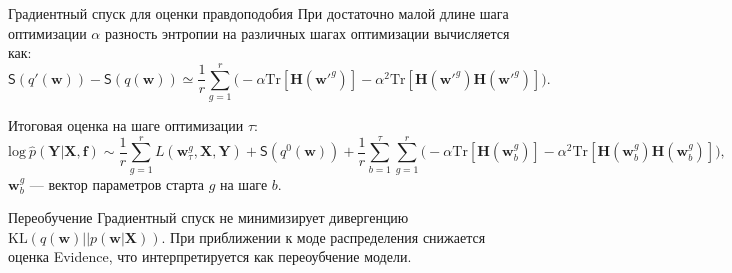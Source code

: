 \documentclass[10pt,pdf,utf8,russian,aspectratio=169]{beamer}
\begin{document}
\begin{frame}{Градиентный спуск для оценки правдоподобия}
При достаточно малой длине шага оптимизации $\alpha$ разность энтропии на различных шагах оптимизации вычисляется как:
\[
\mathsf{S}(q'(\mathbf{w})) -  \mathsf{S}(q(\mathbf{w}))  \simeq  \frac{1}{r}\sum_{g=1}^r \bigl(-\alpha \text{Tr}[\mathbf{H}(\mathbf{w}'^g)] - \alpha^2 \text{Tr}[\mathbf{H}(\mathbf{w}'^g)\mathbf{H}(\mathbf{w}'^g)]  \bigr).
\]

Итоговая оценка на шаге оптимизации $\tau$:
$$
\text{log}~\hat{p}(\mathbf{Y}|\mathbf{X}, \mathbf{f}) \sim \frac{1}{r} \sum_{g = 1}^r L(\mathbf{w}^g_\tau, \mathbf{X}, \mathbf{Y})  + \mathsf{S}(q^0(\mathbf{w})) + \frac{1}{r}\sum_{b=1}^\tau\sum_{g=1}^r \bigl(-\alpha \text{Tr}[\mathbf{H}(\mathbf{w}_b^g)] - \alpha^2 \text{Tr}[\mathbf{H}(\mathbf{w}_b^g)\mathbf{H}(\mathbf{w}_b^g)]  \bigr),
$$
$\mathbf{w}_b^g$ --- вектор параметров старта $g$ на шаге $b$.
\end{frame}
\begin{frame}{Переобучение}
Градиентный спуск не минимизирует дивергенцию $\text{KL}(q(\mathbf{w})||p(\mathbf{w}| \mathbf{X}))$. При приближении к моде распределения снижается оценка Evidence, что интерпретируется как переоубчение модели.

\begin{figure}
  \centering
\label{fig:1}\qquad
\end{figure}
\end{frame}
\end{document}
